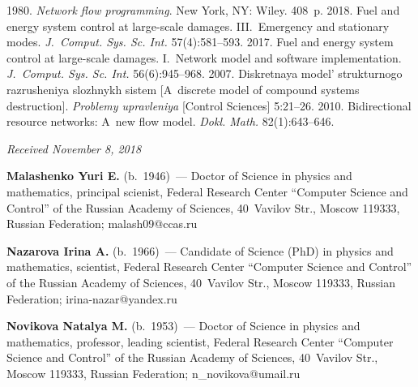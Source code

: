 \begin{multicols}{2}
{{\begin{thebibliography}{9}
 1980. 
\textit{Network flow programming}. New York, NY: Wiley. 408~p. 
2018. Fuel and energy system control at large-scale damages. 
III.~Emergency and stationary modes. 
\textit{J.~Comput. Sys. Sc. Int.}  57(4):581--593.   
2017. Fuel and energy system control at large-scale damages. 
I.~Network model and software implementation.  
\textit{J.~Comput. Sys. Sc. Int.}  56(6):945--968.  
2007. Diskretnaya model' strukturnogo razrusheniya slozhnykh sistem  
[A~discrete model of compound systems destruction]. 
\textit{Problemy upravleniya} [Control Sciences] 5:21--26. 
 2010. 
Bidirectional resource networks: A~new flow model. 
\textit{Dokl. Math.} 82(1):643--646.
\end{thebibliography}

 }
 }

\end{multicols}

\vspace*{-3pt}

\hfill{\small\textit{Received November 8, 2018}}



\Contr

\noindent
\textbf{Malashenko Yuri E.} (b.\ 1946)~--- 
Doctor of Science in physics and mathematics, principal scienist, 
Federal Research Center 
``Computer Science and Control'' of the Russian Academy of Sciences, 40~Vavilov Str., 
Moscow 119333, Russian Federation; \mbox{malash09@ccas.ru}

\vspace*{4pt}
 
\noindent
\textbf{Nazarova Irina A.} (b.\ 1966)~--- 
Candidate of Science (PhD) in physics and mathematics, scientist, 
Federal Research Center 
``Computer Science and Control'' of the Russian Academy of Sciences, 
40~Vavilov Str., Moscow 119333, Russian Federation; \mbox{irina-nazar@yandex.ru}

\vspace*{4pt}
 
\noindent
\textbf{Novikova Natalya M.} (b.\ 1953)~--- 
Doctor of Science in physics and mathematics, professor, leading scientist, 
Federal Research Center 
``Computer Science and Control'' of the Russian Academy of Sciences, 
40~Vavilov Str., Moscow 119333, Russian Federation; \mbox{n\_novikova@umail.ru}


\label{end\stat}

\renewcommand{\bibname}{\protect\rm Литература}       